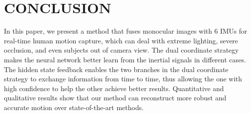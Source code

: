 \section{CONCLUSION}
In this paper, we present a method that fuses monocular images with 6 IMUs for real-time human motion capture, which can deal with extreme lighting, severe occlusion, and even subjects out of camera view.
%
The dual coordinate strategy makes the neural network better learn from the inertial signals in different cases.
%
The hidden state feedback enables the two branches in the dual coordinate strategy to exchange information from time to time, thus allowing the one with high confidence to help the other achieve better results. 
%
Quantitative and qualitative results show that our method can reconstruct more robust and accurate motion over state-of-the-art methods.
